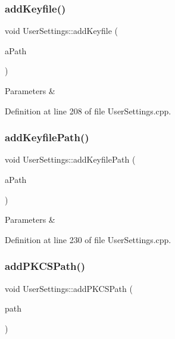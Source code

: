 \subsubsection{\texorpdfstring{add\+Keyfile()}{addKeyfile()}}
{\footnotesize\ttfamily void User\+Settings\+::add\+Keyfile (\begin{DoxyParamCaption}\item[{const Q\+String \&}]{a\+Path }\end{DoxyParamCaption})}


\begin{DoxyParams}{Parameters}
{\em } & \\
\hline
\end{DoxyParams}


Definition at line 208 of file User\+Settings.\+cpp.

\mbox{\label{class_user_settings_a2778eefdc06a1711398c0d19c9e108e1}} 
\subsubsection{\texorpdfstring{add\+Keyfile\+Path()}{addKeyfilePath()}}
{\footnotesize\ttfamily void User\+Settings\+::add\+Keyfile\+Path (\begin{DoxyParamCaption}\item[{const Q\+String \&}]{a\+Path }\end{DoxyParamCaption})}


\begin{DoxyParams}{Parameters}
{\em } & \\
\hline
\end{DoxyParams}


Definition at line 230 of file User\+Settings.\+cpp.

\mbox{\label{class_user_settings_ab53863f6d8d11cbe8972221237536685}} 
\subsubsection{\texorpdfstring{add\+P\+K\+C\+S\+Path()}{addPKCSPath()}}
{\footnotesize\ttfamily void User\+Settings\+::add\+P\+K\+C\+S\+Path (\begin{DoxyParamCaption}\item[{const Q\+Url \&}]{path }\end{DoxyParamCaption})}



